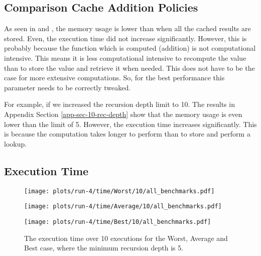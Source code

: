 \subsection{Comparison Cache Addition Policies}

As seen in  and , the memory usage is lower than when all the cached results are stored. Even, the execution time did not increase significantly. However, this is probably because the function which is computed (addition) is not computational intensive. This means it is less computational intensive to recompute the value than to store the value and retrieve it when needed. This does not have to be the case for more extensive computations. So, for the best performance this parameter needs to be correctly tweaked.

For example, if we increased the recursion depth limit to 10. The results in Appendix Section \ref*{app-sec-10-rec-depth} show that the memory usage is even lower than the limit of 5. However, the execution time increases significantly. This is because the computation takes longer to perform than to store and perform a lookup. 

\subsection*{Execution Time}
\begin{figure}[H]
  \begin{minipage}{.5\textwidth}
    \centering
    \texttt{[image: plots/run-4/time/Worst/10/all\_benchmarks.pdf]}  
  \end{minipage}
  \begin{minipage}{.5\textwidth}
    \centering
    \texttt{[image: plots/run-4/time/Average/10/all\_benchmarks.pdf]}  
  \end{minipage}
  \begin{center}
    \begin{minipage}[c]{.5\textwidth}
      \centering
      \texttt{[image: plots/run-4/time/Best/10/all\_benchmarks.pdf]}  
    \end{minipage}
  \end{center}
  \caption{The execution time over 10 executions for the Worst, Average and Best case, where the minimum recursion depth is 5.}
  \label{fig-exec-time-policy-rec-depth-5}
\end{figure}

